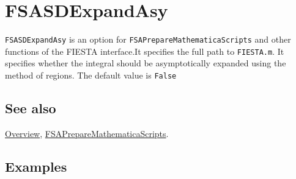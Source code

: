 \documentclass[../FeynHelpersManual.tex]{subfiles}
\begin{document}
\hypertarget{fsasdexpandasy}{
\section{FSASDExpandAsy}\label{fsasdexpandasy}}

\texttt{FSASDExpandAsy} is an option for
\texttt{FSAPrepareMathematicaScripts} and other functions of the FIESTA
interface.It specifies the full path to \texttt{FIESTA.m}. It specifies
whether the integral should be asymptotically expanded using the method
of regions. The default value is \texttt{False}

\subsection{See also}

\hyperlink{toc}{Overview},
\hyperlink{fsapreparemathematicascripts}{FSAPrepareMathematicaScripts}.

\subsection{Examples}
\end{document}

